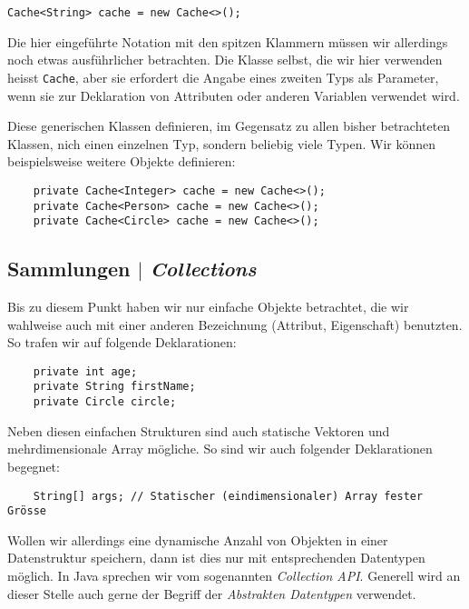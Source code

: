 \texttt{Cache<String> cache = new Cache<>();}

Die hier eingeführte Notation mit den spitzen Klammern müssen wir allerdings noch
etwas ausführlicher betrachten. Die Klasse selbst, die wir hier verwenden heisst
\texttt{Cache}, aber sie erfordert die Angabe eines zweiten Typs als Parameter,
wenn sie zur Deklaration von Attributen oder anderen Variablen verwendet wird.

Diese generischen Klassen definieren, im Gegensatz zu allen bisher betrachteten
Klassen, nich einen einzelnen Typ, sondern beliebig viele Typen. Wir können
beispielsweise weitere Objekte definieren:

\begin{verbatim}
    private Cache<Integer> cache = new Cache<>();
    private Cache<Person> cache = new Cache<>();
    private Cache<Circle> cache = new Cache<>();
\end{verbatim}




\subsection{Sammlungen $|$ \emph{Collections}}
\label{subsec:collections}

Bis zu diesem Punkt haben wir nur einfache Objekte betrachtet, die wir
wahlweise auch mit einer anderen Bezeichnung (Attribut, Eigenschaft)
benutzten. So trafen wir auf folgende Deklarationen:

\begin{verbatim}
    private int age;
    private String firstName;
    private Circle circle;
\end{verbatim}

Neben diesen einfachen Strukturen sind auch statische Vektoren und
mehrdimensionale Array mögliche. So sind wir auch folgender Deklarationen
begegnet:

\begin{verbatim}
    String[] args; // Statischer (eindimensionaler) Array fester Grösse
\end{verbatim}

Wollen wir allerdings eine dynamische Anzahl von Objekten in einer Datenstruktur
speichern, dann ist dies nur mit entsprechenden Datentypen möglich. In Java
sprechen wir vom sogenannten \emph{Collection API}. Generell wird an dieser
Stelle auch gerne der Begriff der \emph{Abstrakten Datentypen} verwendet.


